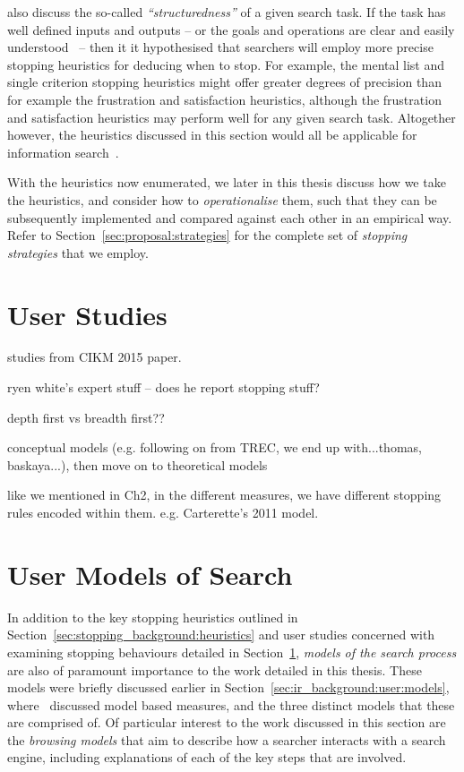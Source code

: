 \cite{browne2005stopping_rules} also discuss the so-called \emph{``structuredness''} of a given search task. If the task has well defined inputs and outputs -- or the goals and operations are clear and easily understood~\citep{simon1996sciences} -- then it it hypothesised that searchers will employ more precise stopping heuristics for deducing when to stop. For example, the mental list and single criterion stopping heuristics might offer greater degrees of precision than for example the frustration and satisfaction heuristics, although the frustration and satisfaction heuristics may perform well for any given search task. Altogether however, the heuristics discussed in this section would all be applicable for information search~\citep{browne2005stopping_rules}.

With the heuristics now enumerated, we later in this thesis discuss how we take the heuristics, and consider how to \emph{operationalise} them, such that they can be subsequently implemented and compared against each other in an empirical way. Refer to Section~\ref{sec:proposal:strategies} for the complete set of \emph{stopping strategies} that we employ.

\section{User Studies}\label{sec:stopping_background:user_studies}

studies from CIKM 2015 paper.

ryen white's expert stuff -- does he report stopping stuff?

depth first vs breadth first??

conceptual models (e.g. following on from TREC, we end up with...thomas, baskaya...), then move on to theoretical models

like we mentioned in Ch2, in the different measures, we have different stopping rules encoded within them.
e.g. Carterette's 2011 model.


\section{User Models of Search}
In addition to the key stopping heuristics outlined in Section~\ref{sec:stopping_background:heuristics} and user studies concerned with examining stopping behaviours detailed in Section~\ref{sec:stopping_background:user_studies}, \emph{models of the search process} are also of paramount importance to the work detailed in this thesis. These models were briefly discussed earlier in Section~\ref{sec:ir_background:user:models}, where~\cite{carterette2011models} discussed model based measures, and the three distinct models that these are comprised of. Of particular interest to the work discussed in this section are the \emph{browsing models} that aim to describe how a searcher interacts with a search engine, including explanations of each of the key steps that are involved.

